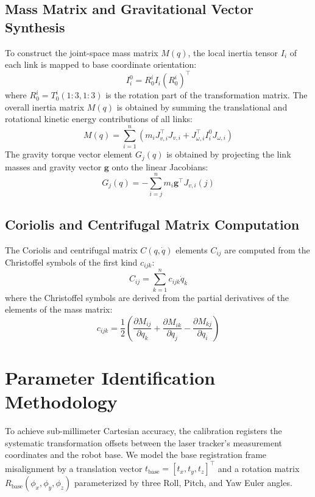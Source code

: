 \documentclass[journal]{IEEEtran}
\begin{document}
\subsection{Mass Matrix and Gravitational Vector Synthesis}
To construct the joint-space mass matrix $M(q)$, the local inertia tensor $I_i$ of each link is mapped to base coordinate orientation:
\begin{equation}
    I_i^0 = R_0^i I_i (R_0^i)^\top
\end{equation}
where $R_0^i = T_0^i(1:3,1:3)$ is the rotation part of the transformation matrix. The overall inertia matrix $M(q)$ is obtained by summing the translational and rotational kinetic energy contributions of all links:
\begin{equation}
    M(q) = \sum_{i=1}^n \left( m_i J_{v,i}^\top J_{v,i} + J_{\omega,i}^\top I_i^0 J_{\omega,i} \right)
\end{equation}
The gravity torque vector element $G_j(q)$ is obtained by projecting the link masses and gravity vector $\textbf{g}$ onto the linear Jacobians:
\begin{equation}
    G_j(q) = -\sum_{i=j}^n m_i \textbf{g}^\top J_{v,i}(j)
\end{equation}

\subsection{Coriolis and Centrifugal Matrix Computation}
The Coriolis and centrifugal matrix $C(q, \dot{q})$ elements $C_{ij}$ are computed from the Christoffel symbols of the first kind $c_{ijk}$:
\begin{equation}
    C_{ij} = \sum_{k=1}^n c_{ijk} \dot{q}_k
\end{equation}
where the Christoffel symbols are derived from the partial derivatives of the elements of the mass matrix:
\begin{equation}
    c_{ijk} = \frac{1}{2} \left( \frac{\partial M_{ij}}{\partial q_k} + \frac{\partial M_{ik}}{\partial q_j} - \frac{\partial M_{kj}}{\partial q_i} \right)
\end{equation}
\section{Parameter Identification Methodology}

To achieve sub-millimeter Cartesian accuracy, the calibration registers the systematic transformation offsets between the laser tracker's measurement coordinates and the robot base. We model the base registration frame misalignment by a translation vector $t_{\text{base}} = [t_x, t_y, t_z]^\top$ and a rotation matrix $R_{\text{base}}(\phi_x, \phi_y, \phi_z)$ parameterized by three Roll, Pitch, and Yaw Euler angles.
\end{document}
